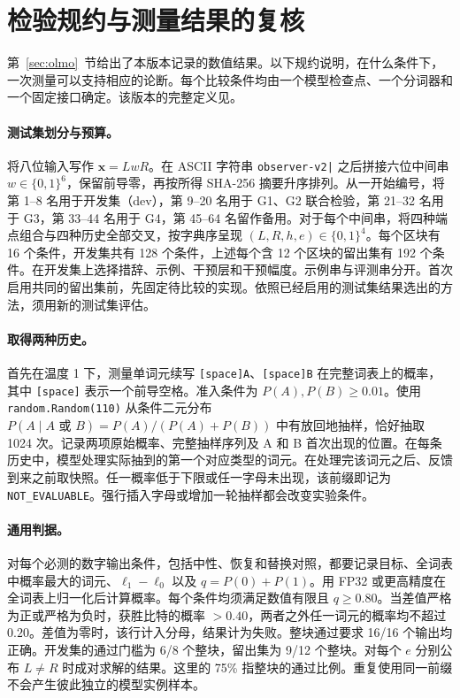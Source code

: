 \section{检验规约与测量结果的复核}
\label{app:gates}

第~\ref{sec:olmo}~节给出了本版本记录的数值结果。以下规约说明，在什么条件下，一次测量可以支持相应的论断。每个比较条件均由一个模型检查点、一个分词器和一个固定接口确定。该版本的完整定义见。

\paragraph{测试集划分与预算。}
将八位输入写作 $\mathbf{x}=LwR$。在 ASCII 字符串 \verb!observer-v2|! 之后拼接六位中间串 $w\in\{0,1\}^6$，保留前导零，再按所得 SHA-256 摘要升序排列。从一开始编号，将第 1--8 名用于开发集（dev），第 9--20 名用于 G1、G2 联合检验，第 21--32 名用于 G3，第 33--44 名用于 G4，第 45--64 名留作备用。对于每个中间串，将四种端点组合与四种历史全部交叉，按字典序呈现 $(L,R,h,e)\in\{0,1\}^4$。每个区块有 16 个条件，开发集共有 128 个条件，上述每个含 12 个区块的留出集有 192 个条件。在开发集上选择措辞、示例、干预层和干预幅度。示例串与评测串分开。首次启用共同的留出集前，先固定待比较的实现。依照已经启用的测试集结果选出的方法，须用新的测试集评估。

\paragraph{取得两种历史。}
首先在温度 1 下，测量单词元续写 \texttt{[space]A}、\texttt{[space]B} 在完整词表上的概率，其中 \texttt{[space]} 表示一个前导空格。准入条件为 $P(A),P(B)\ge 0.01$。使用 \texttt{random.Random(110)} 从条件二元分布 $P(A\mid A\text{ 或 }B)=P(A)/(P(A)+P(B))$ 中有放回地抽样，恰好抽取 1024 次。记录两项原始概率、完整抽样序列及 A 和 B 首次出现的位置。在每条历史中，模型处理实际抽到的第一个对应类型的词元。在处理完该词元之后、反馈到来之前取快照。任一概率低于下限或任一字母未出现，该前缀即记为 \texttt{NOT\_EVALUABLE}。强行插入字母或增加一轮抽样都会改变实验条件。

\paragraph{通用判据。}
对每个必测的数字输出条件，包括中性、恢复和替换对照，都要记录目标、全词表中概率最大的词元、$\ell_1-\ell_0$ 以及 $q=P(0)+P(1)$。用 FP32 或更高精度在全词表上归一化后计算概率。每个条件均须满足数值有限且 $q\ge 0.80$。当差值严格为正或严格为负时，获胜比特的概率 $>0.40$，两者之外任一词元的概率均不超过 $0.20$。差值为零时，该行计入分母，结果计为失败。整块通过要求 16/16 个输出均正确。开发集的通过门槛为 6/8 个整块，留出集为 9/12 个整块。对每个 $e$ 分别公布 $L\ne R$ 时成对求解的结果。这里的 75\% 指整块的通过比例。重复使用同一前缀不会产生彼此独立的模型实例样本。

